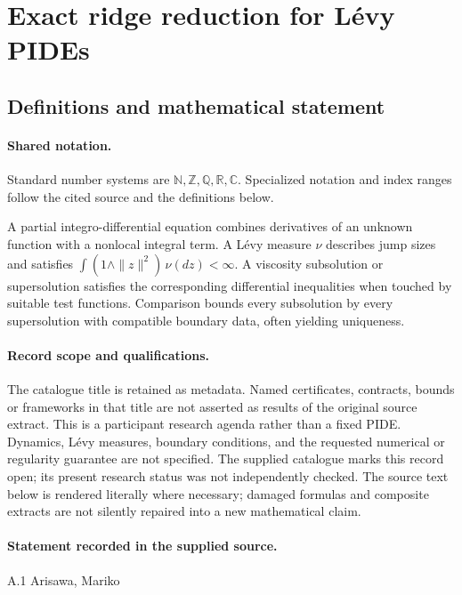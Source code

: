 \documentclass[11pt]{article}
\begin{document}
\section{Exact ridge reduction for Lévy PIDEs}\label{statement}

\subsection{Definitions and mathematical statement}

\paragraph{Shared notation.}Standard number systems are $\mathbb N,\mathbb Z,\mathbb Q,\mathbb R,\mathbb C$. Specialized notation and index ranges follow the cited source and the definitions below.


A partial integro-differential equation combines derivatives of an unknown function with a nonlocal integral term. A Lévy measure $\nu$ describes jump sizes and satisfies $\int(1\wedge\|z\|^2)\,\nu(dz)<\infty$. A viscosity subsolution or supersolution satisfies the corresponding differential inequalities when touched by suitable test functions. Comparison bounds every subsolution by every supersolution with compatible boundary data, often yielding uniqueness.
\paragraph{Record scope and qualifications.}
The catalogue title is retained as metadata. Named certificates, contracts, bounds or frameworks in that title are not asserted as results of the original source extract.
This is a participant research agenda rather than a fixed PIDE. Dynamics, Lévy measures, boundary conditions, and the requested numerical or regularity guarantee are not specified. The supplied catalogue marks this record open; its present research status was not independently checked.
The source text below is rendered literally where necessary; damaged formulas and composite extracts are not silently repaired into a new mathematical claim.
\paragraph{Statement recorded in the supplied source.}
A.1 Arisawa, Mariko
\end{document}
